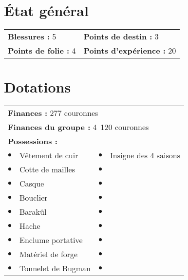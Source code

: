 \documentclass{scrartcl}
\begin{document}
\section*{{\'E}tat général}

\begin{tabular}{X{\arrlenZ} X{\arrlenZ}}
\textbf{Blessures :} 5 & \textbf{Points de destin :} 3 \\
\textbf{Points de folie :} 4 & \textbf{Points d'expérience :} 20 \\
\end{tabular}

\section*{Dotations}

\begin{tabular}{cX{\arrlenZ} cX{\arrlenZ}}
\multicolumn{4}{l}{\textbf{Finances :} 277 couronnes} \\
\multicolumn{4}{l}{\textbf{Finances du groupe :} 4~120 couronnes} \\
\multicolumn{4}{l}{\textbf{Possessions :}} \\
$\bullet$ & Vêtement de cuir & $\bullet$ & Insigne des 4 saisons \\
$\bullet$ & Cotte de mailles & $\bullet$ & \\
$\bullet$ & Casque & $\bullet$ & \\
$\bullet$ & Bouclier & $\bullet$ & \\
$\bullet$ & Barakûl & $\bullet$ & \\
$\bullet$ & Hache & $\bullet$ & \\
$\bullet$ & Enclume portative & $\bullet$ & \\
$\bullet$ & Matériel de forge & $\bullet$ & \\
$\bullet$ & Tonnelet de Bugman & $\bullet$ & \\
\end{tabular}
\end{document}

